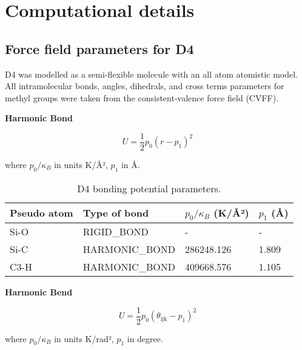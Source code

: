 
\section{Computational details}\label{si-computational-details}

\subsection{Force field parameters for D4}\label{force-field-parameters-for-d4}

D4 was modelled as a semi-flexible molecule with an all atom atomistic model.
All intramolecular bonds, angles, dihedrals, and cross terms parameters for
methyl groups were taken from the consistent-valence force field (CVFF).
\citep{dauber-osguthorpeStructureEnergeticsLigand1988}

\textbf{Harmonic Bond}

\begin{equation}
    U = \frac{1}{2}p_{0}{(r - p_{1})}^{2}
\end{equation}

where \(p_0 / \kappa_B\) in units K/Å², \(p_{1}\) in Å. 

\begin{table}[H]
    \centering
    \caption{%
        D4 bonding potential parameters.
    }\label{tbl:ff-d4-bond}
    \begin{tabular}{@{}llll@{}}
        Pseudo atom & Type of bond & \(p_0 / \kappa_B\) (K/Å²) & \(p_{1}\) (Å) \\
        \midrule
        Si-O & RIGID\_BOND & - & -\\
        Si-C & HARMONIC\_BOND & 286248.126 & 1.809\\
        C3-H & HARMONIC\_BOND & 409668.576 & 1.105\\
        \bottomrule
    \end{tabular}
\end{table}

\textbf{Harmonic Bend}

\begin{equation}
    U = \frac{1}{2}p_{0}{(\theta_{\text{ijk}} - p_{1})}^{2}
\end{equation}

where \(p_0 / \kappa_B\) in units K/rad², \(p_{1}\) in degree.

